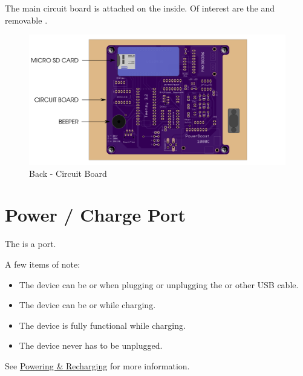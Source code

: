 The main circuit board is attached on the inside.  Of interest are
the  and removable .

\begin{figure}[H]
\centering
  \includegraphics{images/back_circuit_board.png}
\caption{Back - Circuit Board}
\end{figure}

\section{Power / Charge Port} \label{Power Port}

The  is a  port.

\par\medskip

A few items of note:

\begin{itemize}
  \item The device can be  or  when plugging or unplugging the
    \hyperref[Power Adapter]{} or other USB cable.
  \item The device can be  or  while charging.
  \item The device is fully functional while charging.
  \item The device never has to be unplugged.
\end{itemize}

See \hyperref[Powering and Recharging]{Powering \& Recharging} for more
information.

